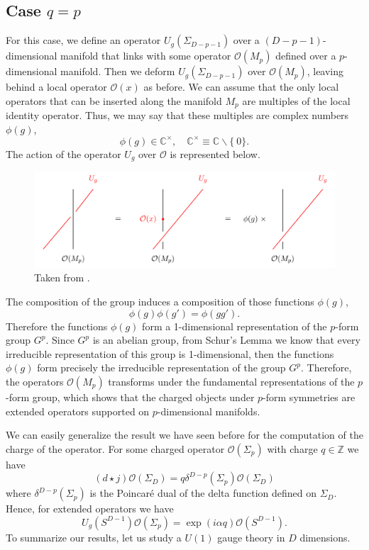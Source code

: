 \documentclass{article}
\begin{document}
\subsection*{Case $q=p$}
For this case, we define an operator $U_g(\Sigma_{D-p-1})$ over a $(D-p-1)$-dimensional manifold that links with some operator  $\mathcal{O}(M_p)$ defined over a $p$-dimensional manifold. Then we deform $U_g(\Sigma_{D-p-1})$  over $\mathcal{O}(M_p)$, leaving behind a local operator $\mathcal{O}(x)$ as before. We can assume that the only local operators that can be inserted along the manifold $M_p$ are multiples of the local identity operator. Thus, we may say that these multiples are complex numbers $\phi(g)$,  
$$
\phi(g)\in \mathbb{C}^{\times},\quad \mathbb{C}^{\times}\equiv \mathbb{C}\backslash\{\ 0 \}.
$$
The action of the operator $U_g$ over $\mathcal{O}$ is represented below. 
\begin{figure}[H]
	\centering
	\includegraphics[scale=0.4]{figures/linking2.png}
	\caption{Taken from \cite{Bhardwaj}.} 
\end{figure}
The composition of the group induces a composition of those functions $\phi(g)$, 
\begin{equation}
	\phi(g)\phi(g')=\phi(gg').
\end{equation}
Therefore the functions $\phi(g)$ form a 1-dimensional representation of the $p$-form group $G^p$.  Since $G^p$ is an abelian group, from Schur’s Lemma we know that every irreducible representation of this group is 1-dimensional, then the functions $\phi(g)$ form precisely the irreducible representation of the group $G^p$. Therefore, the operators $\mathcal{O}(M_p)$ transforms under the fundamental representations of the $p$-form group, which shows that the charged objects under $p$-form symmetries are extended operators supported on $p$-dimensional manifolds. 

We can easily generalize the result we have seen before for the computation of the charge of the operator. For some  charged operator $\mathcal{O}(\Sigma_p)$ with charge $q\in\mathbb{Z}$ we have
\begin{equation}\label{action of hf symmetry}
	(d\star j)\mathcal{O}(\Sigma_D)=q\delta^{D-p}(\Sigma_p)\mathcal{O}(\Sigma_D)
\end{equation}
where $\delta^{D-p}(\Sigma_p)$  is the Poincaré dual of the delta function defined on $\Sigma_D$. Hence, for extended operators we have 
\begin{equation}
	U_g(S^{D-1})\mathcal{O}(\Sigma_p)=\exp(i\alpha q)\mathcal{O}(S^{D-1}).
\end{equation}
To summarize our results, let us study a $U(1)$ gauge theory in $D$ dimensions. 
\end{document}
